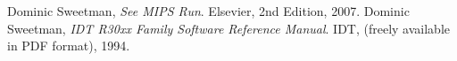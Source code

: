 
\begin{thebibliography}{9}
\label{references}

  Dominic Sweetman,
  \emph{See MIPS Run}.
  Elsevier,
  2nd Edition,
  2007.
  Dominic Sweetman,
  \emph{IDT R30xx Family Software Reference Manual}.
  IDT,
  (freely available in PDF format),
  1994.

\end{thebibliography}

